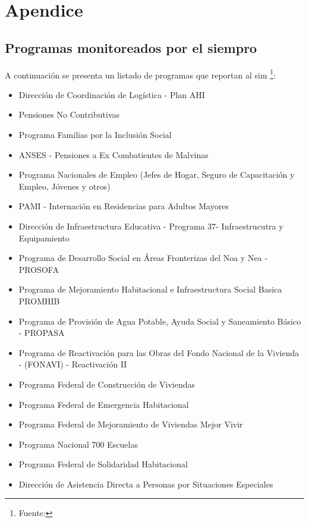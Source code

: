 \newpage
\appendix
\section{Apendice}\label{apendice-siempro}

\subsection{Programas monitoreados por el \acrshort{siempro}}

A continuación se presenta un listado de programas que reportan al \ac{sim} \footnote{Fuente: }:
    \begin{itemize}
        \item Dirección de Coordinación de Logística - Plan AHI
        \item Pensiones No Contributivas
        \item Programa Familias por la Inclusión Social
        \item ANSES - Pensiones a Ex Combatientes de Malvinas
        \item Programa Nacionales de Empleo (Jefes de Hogar, Seguro de Capacitación y Empleo, Jóvenes y otros)
        \item PAMI - Internación en Residencias para Adultos Mayores
        \item Dirección de Infraestructura Educativa - Programa 37- Infraestrucutra y Equipamiento
        \item Programa de Desarrollo Social en Áreas Fronterizas del Noa y Nea  - PROSOFA
        \item Programa de Mejoramiento Habitacional e Infraestructura Social Basica PROMHIB
        \item Programa de Provisión de Agua Potable, Ayuda Social y Saneamiento Básico - PROPASA
        \item Programa de Reactivación para las Obras del Fondo Nacional de la Vivienda - (FONAVI) - Reactivación II
        \item Programa Federal de Construcción de Viviendas
        \item Programa Federal de Emergencia Habitacional
        \item Programa Federal de Mejoramiento de Viviendas Mejor Vivir
        \item Programa Nacional 700 Escuelas
        \item Programa Federal de Solidaridad Habitacional
        \item Dirección de Asistencia Directa a Personas por Situaciones Especiales

\end{itemize}
